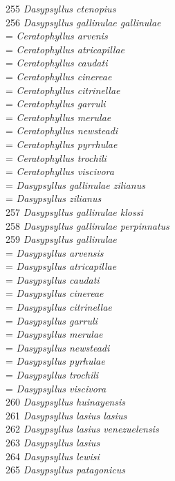 \documentclass[
]{article}
\begin{document}
255 \emph{Dasypsyllus ctenopius}\\
256 \emph{Dasypsyllus gallinulae gallinulae}\\
= \emph{Ceratophyllus arvenis}\\
= \emph{Ceratophyllus atricapillae}\\
= \emph{Ceratophyllus caudati}\\
= \emph{Ceratophyllus cinereae}\\
= \emph{Ceratophyllus citrinellae}\\
= \emph{Ceratophyllus garruli}\\
= \emph{Ceratophyllus merulae}\\
= \emph{Ceratophyllus newsteadi}\\
= \emph{Ceratophyllus pyrrhulae}\\
= \emph{Ceratophyllus trochili}\\
= \emph{Ceratophyllus viscivora}\\
= \emph{Dasypsyllus gallinulae zilianus}\\
= \emph{Dasypsyllus zilianus}\\
257 \emph{Dasypsyllus gallinulae klossi}\\
258 \emph{Dasypsyllus gallinulae perpinnatus}\\
259 \emph{Dasypsyllus gallinulae}\\
= \emph{Dasypsyllus arvensis}\\
= \emph{Dasypsyllus atricapillae}\\
= \emph{Dasypsyllus caudati}\\
= \emph{Dasypsyllus cinereae}\\
= \emph{Dasypsyllus citrinellae}\\
= \emph{Dasypsyllus garruli}\\
= \emph{Dasypsyllus merulae}\\
= \emph{Dasypsyllus newsteadi}\\
= \emph{Dasypsyllus pyrhulae}\\
= \emph{Dasypsyllus trochili}\\
= \emph{Dasypsyllus viscivora}\\
260 \emph{Dasypsyllus huinayensis}\\
261 \emph{Dasypsyllus lasius lasius}\\
262 \emph{Dasypsyllus lasius venezuelensis}\\
263 \emph{Dasypsyllus lasius}\\
264 \emph{Dasypsyllus lewisi}\\
265 \emph{Dasypsyllus patagonicus}\\
\end{document}
